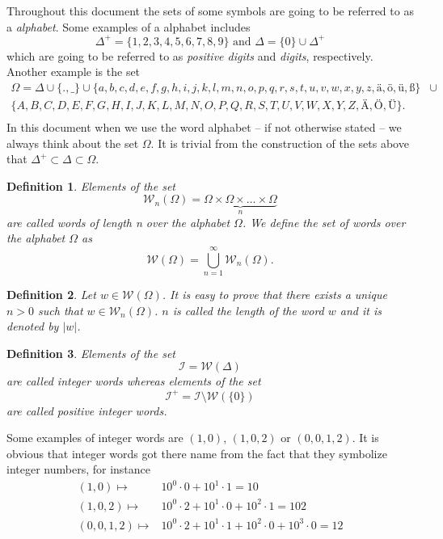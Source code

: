 \documentclass{scrartcl}
\newtheorem{mydef}{Definition}
\begin{document}
Throughout this document the sets of some symbols are going to be referred to as a \emph{alphabet}. Some examples of a alphabet includes
$$\Delta^+=\{1,2,3,4,5,6,7,8,9\} \mbox{ and }\Delta=\{0\}\cup\Delta^+$$
which are going to be referred to as \emph{positive digits} and \emph{digits}, respectively. Another example is the set 
\begin{equation}
\begin{split}
\Omega=\Delta \cup \{.,\_\}\cup\{a,b,c,d,e,f,g,h,i,j,k,l,m,n,o,p,q,r,s,t,u,v,w,x,y,z,ä,ö,ü,ß\} & \cup\\
\{A,B,C,D,E,F,G,H,I,J,K,L,M,N,O,P,Q,R,S,T,U,V,W,X,Y,Z,Ä,Ö,Ü\}. & \\
\end{split}
\end{equation}
In this document when we use the word alphabet -- if not otherwise stated -- we always think about the set $\Omega$. It is trivial from the construction of the sets above that $\Delta^+\subset\Delta\subset\Omega$.

\begin{mydef}
Elements of the set $$\mathcal{W}_n(\Omega)=\underbrace{\Omega\times \Omega\times\ldots \times \Omega}_{n}$$ are called \emph{words of length n over the alphabet $\Omega$}. We define the \emph{set of words over the alphabet $\Omega$} as $$\mathcal{W}(\Omega)=\bigcup_{n=1}^{\infty}\mathcal{W}_n(\Omega).$$
\end{mydef}

\begin{mydef}
Let $w\in\mathcal{W}({\Omega})$. It is easy to prove that there exists a unique $n>0$ such that $w\in\mathcal{W}_n({\Omega})$. $n$ is called the \emph{length} of the word $w$ and it is denoted by $|w|$.
\end{mydef}

\begin{mydef} 
Elements of the set
$$\mathcal{I}=\mathcal{W}(\Delta)$$
are called \emph{integer words} whereas elements of the set
$$\mathcal{I}^+=\mathcal{I}\setminus\mathcal{W}(\{0\})$$ are called \emph{positive integer words}.
\end{mydef}

Some examples of integer words are $(1,0)$, $(1,0,2)$ or $(0,0,1,2)$. It is obvious that integer words got there name from the fact that they symbolize integer numbers, for instance
\begin{equation}
\begin{split}
(1,0)\mapsto & 10^0\cdot 0+10^1\cdot 1=10\\
(1,0,2)\mapsto & 10^0\cdot 2 + 10^1\cdot 0 + 10^2\cdot 1=102\\
(0,0,1,2)\mapsto & 10^0\cdot 2 + 10^1\cdot 1 + 10^2\cdot 0 + 10^3\cdot 0=12
\end{split}
\end{equation}
\end{document}
